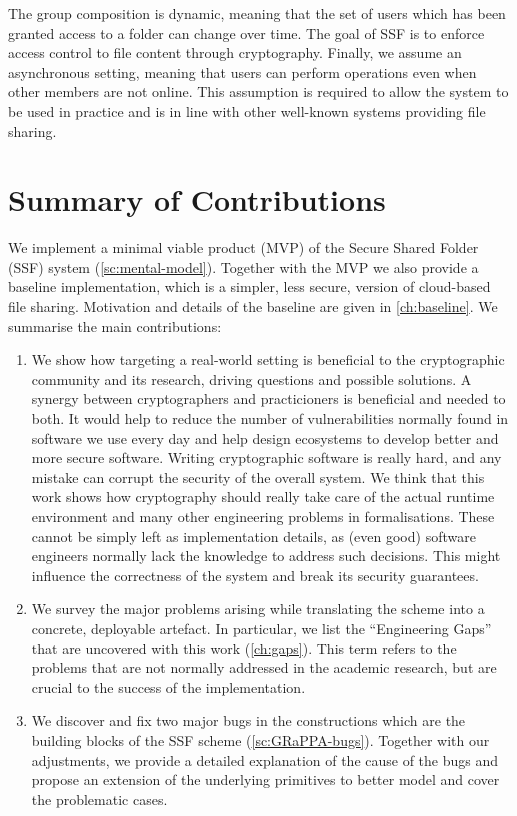 The group composition is dynamic, meaning that the set of users which has been granted access to a folder can change over time.
The goal of SSF is to enforce access control to file content through cryptography.
Finally, we assume an asynchronous setting, meaning that users can
perform operations even when other members are not online.
This assumption is required to allow the system to be used in practice
and is in line with other well-known systems providing file sharing.

\section{Summary of Contributions}\label{sc:summary-of-contributions}

We implement a minimal viable product (MVP) of the Secure Shared Folder (SSF) system (\cref{sc:mental-model}).
Together with the MVP we also provide a baseline implementation, which is
a simpler, less secure, version of cloud-based file sharing. Motivation
and details of the baseline are given in \cref{ch:baseline}.
We summarise the main contributions:

\begin{enumerate}
    \item We show how targeting a real-world setting is 
    beneficial to the cryptographic community and its 
    research, driving questions and possible solutions. 
    A synergy between cryptographers and practicioners 
    is beneficial and needed to both. It would help to 
    reduce the number of vulnerabilities normally found 
    in software we use every day and help design ecosystems 
    to develop better and more secure software. 
    Writing cryptographic software is really hard, 
    and any mistake can corrupt the security of the overall 
    system. We think that this work shows how cryptography 
    should really take care of the actual runtime environment 
    and many other engineering problems in formalisations. 
    These cannot be simply left as implementation details, 
    as (even good) software engineers normally lack the 
    knowledge to address such decisions. This might influence 
    the correctness of the system and break its security guarantees.
    \item We survey the major problems arising while 
    translating the scheme into a concrete, deployable 
    artefact. In particular, we list the ``Engineering Gaps''
    that are uncovered with this work (\cref{ch:gaps}). 
    This term refers to 
    the problems that are not normally addressed in the 
    academic research, but are crucial to the success of 
    the implementation.
    \item We discover and fix two major bugs in the 
    constructions which are the building blocks of 
    the SSF scheme (\cref{sc:GRaPPA-bugs}). 
    Together with our adjustments, we provide a 
    detailed explanation of the cause of the bugs and 
    propose an extension of the underlying primitives to 
    better model and cover the problematic cases.
\end{enumerate}

